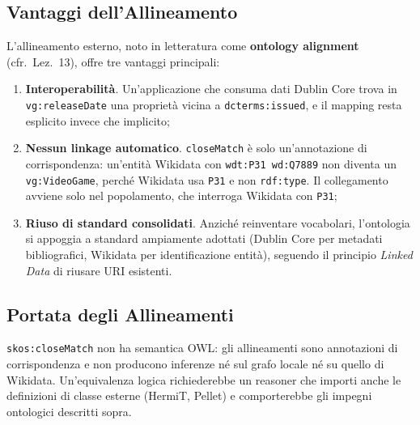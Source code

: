 \subsection{Vantaggi dell'Allineamento}

L'allineamento esterno, noto in letteratura come \textbf{ontology alignment}
(cfr.~Lez.~13), offre tre vantaggi principali:

\begin{enumerate}[nosep]
  \item \textbf{Interoperabilit\`a}. Un'applicazione che consuma dati Dublin Core
    trova in \texttt{vg:releaseDate} una propriet\`a vicina a \texttt{dcterms:issued}, e il mapping
    resta esplicito invece che implicito;
  \item \textbf{Nessun linkage automatico}. \texttt{closeMatch} \`e solo un'annotazione di
    corrispondenza: un'entit\`a Wikidata con \texttt{wdt:P31 wd:Q7889} non diventa un
    \texttt{vg:VideoGame}, perch\'e Wikidata usa \texttt{P31} e non \texttt{rdf:type}. Il collegamento
    avviene solo nel popolamento, che interroga Wikidata con \texttt{P31};
  \item \textbf{Riuso di standard consolidati}. Anzich\'e reinventare vocabolari,
    l'ontologia si appoggia a standard ampiamente adottati (Dublin Core per
    metadati bibliografici, Wikidata per identificazione entit\`a), seguendo
    il principio \textit{Linked Data} di riusare URI esistenti.
\end{enumerate}

\subsection{Portata degli Allineamenti}

\texttt{skos:closeMatch} non ha semantica OWL: gli allineamenti sono annotazioni di corrispondenza e non
producono inferenze n\'e sul grafo locale n\'e su quello di Wikidata. Un'equivalenza logica richiederebbe
un reasoner che importi anche le definizioni di classe esterne (HermiT, Pellet) e comporterebbe gli
impegni ontologici descritti sopra.
